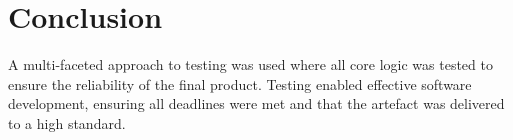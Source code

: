 \section{Conclusion}
\label{testing:conclusion}

A multi-faceted approach to testing was used where all core logic was tested to ensure the reliability of the final product. Testing enabled effective software development, ensuring all deadlines were met and that the artefact was delivered to a high standard.